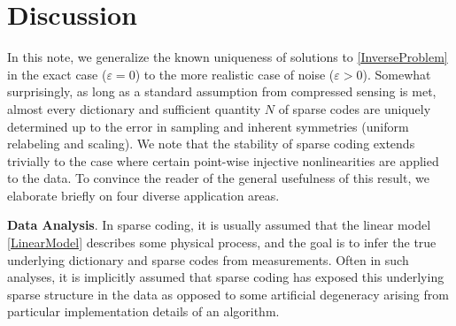 \documentclass[journal, twocolumn]{IEEEtran}
\begin{document}


\section{Discussion}\label{Discussion}

In this note, we generalize the known uniqueness of solutions to \eqref{InverseProblem} in the exact case ($\varepsilon = 0$) to the more realistic case of noise ($\varepsilon > 0$).  Somewhat surprisingly, as long as a standard assumption from compressed sensing is met, almost every dictionary and sufficient quantity $N$ of sparse codes are uniquely determined up to the error in sampling and inherent symmetries (uniform relabeling and scaling). We note that the stability of sparse coding extends trivially to the case where certain point-wise injective nonlinearities are applied to the data. To convince the reader of the general usefulness of this result, we elaborate briefly on four diverse application areas.


\textbf{Data Analysis}.  
In sparse coding, it is usually assumed that the linear model \eqref{LinearModel} describes some physical process, and the goal is to infer the true underlying dictionary and sparse codes from measurements. Often in such analyses, it is implicitly assumed that sparse coding has exposed this underlying sparse structure in the data as opposed to some artificial degeneracy arising from particular implementation details of an algorithm. 
\end{document}
